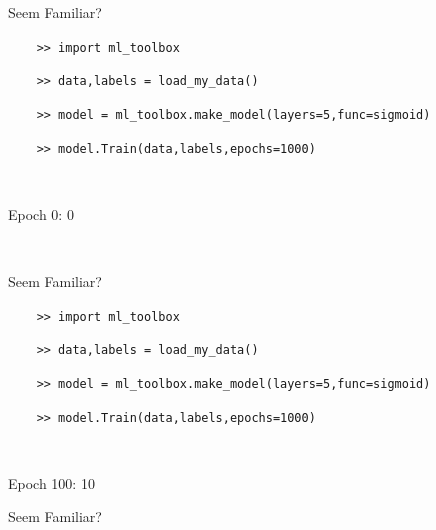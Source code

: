\documentclass[]{SangerLibrary/sanger-present}
\begin{document}
	{
	
		\nologo{}
		\begin{frame}[fragile]{\color{computer}Seem Familiar?}
			
			{\color{computer}
			\pause\verb|    >> import ml_toolbox|\par\par
			\pause \verb|    >> data,labels = load_my_data()|\par\par
			\pause \verb|    >> model = ml_toolbox.make_model(layers=5,func=sigmoid)|\par\par
			\pause \verb|    >> model.Train(data,labels,epochs=1000)|\par~\par
			\pause\verb@    Epoch 0: 0%|                | [0/1000 10it/s, loss = 10.4]@\par~\par

			~
			}
		\end{frame}
		\begin{frame}[fragile]{\color{computer}Seem Familiar?}
			
			{\color{computer}
			\verb|    >> import ml_toolbox|\par\par
			\verb|    >> data,labels = load_my_data()|\par\par
			\verb|    >> model = ml_toolbox.make_model(layers=5,func=sigmoid)|\par\par
			\verb|    >> model.Train(data,labels,epochs=1000)|\par~\par
			\verb@    Epoch 100: 10%|xx              | [100/1000 10it/s, loss = 5.5]@\par~\par~
			}
		\end{frame}
		\begin{frame}[fragile]{\color{computer}Seem Familiar?}
			

\end{frame}}
\end{document}
